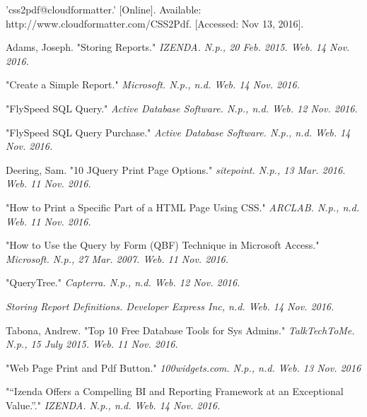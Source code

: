 \documentclass[letterpaper,10pt,serif, draftclsnofoot,onecolumn, compsoc, titlepage]{IEEEtran}
\begin{document}
\begin{thebibliography}{2}
'css2pdf@cloudformatter.' [Online]. Available: http://www.cloudformatter.com/CSS2Pdf. [Accessed: Nov 13, 2016].


Adams, Joseph. "Storing Reports." \em{IZENDA}. N.p., 20 Feb. 2015. Web. 14 Nov. 2016.

 "Create a Simple Report." \em{Microsoft}. N.p., n.d. Web. 14 Nov. 2016.

"FlySpeed SQL Query." \em{Active Database Software}. N.p., n.d. Web. 12 Nov. 2016.

"FlySpeed SQL Query Purchase." \em{Active Database Software}. N.p., n.d. Web. 14 Nov. 2016.

 Deering, Sam. "10 JQuery Print Page Options." \em{sitepoint}. N.p., 13 Mar. 2016. Web. 11 Nov. 2016. 

"How to Print a Specific Part of a HTML Page Using CSS." \em{ARCLAB}. N.p., n.d. Web. 11 Nov. 2016. 

"How to Use the Query by Form (QBF) Technique in Microsoft Access." \em{Microsoft}. N.p., 27 Mar. 2007. Web. 11 Nov. 2016.

"QueryTree." \em{Capterra}. N.p., n.d. Web. 12 Nov. 2016.

\em{Storing Report Definitions}. Developer Express Inc, n.d. Web. 14 Nov. 2016.

Tabona, Andrew. "Top 10 Free Database Tools for Sys Admins." \em{TalkTechToMe}. N.p., 15 July 2015. Web. 11 Nov. 2016. 

"Web Page Print and Pdf Button." \em{100widgets.com}. N.p., n.d. Web. 13 Nov. 2016

"“Izenda Offers a Compelling BI and Reporting Framework at an Exceptional Value.”." \em{IZENDA}. N.p., n.d. Web. 14 Nov. 2016.
\end{thebibliography}
\end{document}
